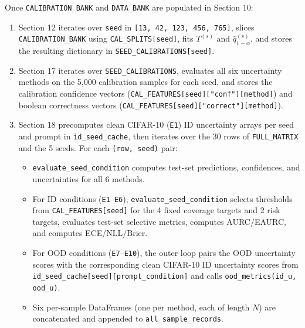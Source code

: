 \documentclass[11pt,a4paper]{article}
\begin{document}
Once \texttt{CALIBRATION\_\allowbreak{}BANK} and \texttt{DATA\_\allowbreak{}BANK} are populated in Section 10:
\begin{enumerate}
  \item Section 12 iterates over \texttt{seed} in \texttt{[13,\allowbreak{} 42,\allowbreak{} 123,\allowbreak{} 456,\allowbreak{} 765]}, slices \texttt{CALIBRATION\_\allowbreak{}BANK} using \texttt{CAL\_\allowbreak{}SPLITS[seed]}, fits $T^{(s)}$ and $\hat{q}_{1-\alpha}^{(s)}$, and stores the resulting dictionary in \texttt{SEED\_\allowbreak{}CALIBRATIONS[seed]}.
  \item Section 17 iterates over \texttt{SEED\_\allowbreak{}CALIBRATIONS}, evaluates all six uncertainty methods on the 5,000 calibration samples for each seed, and stores the calibration confidence vectors (\texttt{CAL\_\allowbreak{}FEATURES[seed]["conf"][method]}) and boolean correctness vectors (\texttt{CAL\_\allowbreak{}FEATURES[seed]["correct"][method]}).
  \item Section 18 precomputes clean CIFAR-10 (\texttt{E1}) ID uncertainty arrays per seed and prompt in \texttt{id\_\allowbreak{}seed\_\allowbreak{}cache}, then iterates over the 30 rows of \texttt{FULL\_\allowbreak{}MATRIX} and the 5 seeds. For each \texttt{(\allowbreak{}row,\allowbreak{} seed)} pair:
  \begin{itemize}
    \item \texttt{evaluate\_\allowbreak{}seed\_\allowbreak{}condition} computes test-set predictions, confidences, and uncertainties for all 6 methods.
    \item For ID conditions (\texttt{E1}--\texttt{E6}), \texttt{evaluate\_\allowbreak{}seed\_\allowbreak{}condition} selects thresholds from \texttt{CAL\_\allowbreak{}FEATURES[seed]} for the 4 fixed coverage targets and 2 risk targets, evaluates test-set selective metrics, computes AURC/EAURC, and computes ECE/NLL/Brier.
    \item For OOD conditions (\texttt{E7}--\texttt{E10}), the outer loop pairs the OOD uncertainty scores with the corresponding clean CIFAR-10 ID uncertainty scores from \texttt{id\_\allowbreak{}seed\_\allowbreak{}cache[seed][prompt\_\allowbreak{}condition]} and calls \texttt{ood\_\allowbreak{}metrics(\allowbreak{}id\_\allowbreak{}u,\allowbreak{} ood\_\allowbreak{}u)}.
    \item Six per-sample DataFrames (one per method, each of length $N$) are concatenated and appended to \texttt{all\_\allowbreak{}sample\_\allowbreak{}records}.
  \end{itemize}
\end{enumerate}
\end{document}
